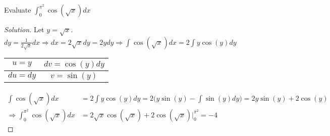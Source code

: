 \documentclass[crop=false,class=book,oneside]{standalone}
\begin{document}
\begin{problem}
Evaluate $\int_{0}^{\pi^{2}}\cos(\sqrt{x})dx$
\end{problem}
\begin{proof}[Solution]
Let $y=\sqrt{x}$. $dy=\frac{1}{2\sqrt{x}}dx\Rightarrow dx=2\sqrt{x}dy=2ydy\Rightarrow\int\cos(\sqrt{x})dx=2\int y\cos(y)dy$
\begin{table}[H]
    \centering
    \begin{tabular}{|c|c|}
        \hline
        $u=y$&$dv=\cos(y)dy$\\
        \hline
        $du=dy$&$v=\sin(y)$\\
        \hline
    \end{tabular}
\end{table}
\begin{align*}
    \int\cos(\sqrt{x})dx&=2\int y\cos(y)dy=2\big(y\sin(y)-\int\sin(y)dy\big)=2y\sin(y)+2\cos(y)\\
    \Rightarrow \int_{0}^{\pi^{2}}\cos(\sqrt{x})dx&=2\sqrt{x}\cos(\sqrt{x})+2\cos(\sqrt{x})\big|_{0}^{\pi^{2}}=-4
\end{align*}
\end{proof}
\end{document}
